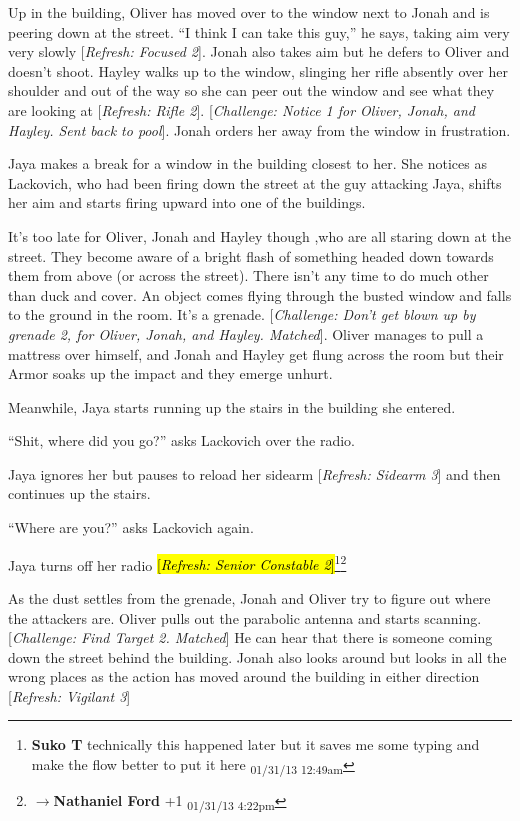 Up in the building, Oliver has moved over to the window next to Jonah and is peering down at the street.  ``I think I can take this guy,'' he says, taking aim very very slowly {[}\textit{Refresh: Focused 2}{]}.  Jonah also takes aim but he defers to Oliver and doesn't shoot.  Hayley walks up to the window, slinging her rifle absently over her shoulder and out of the way so she can peer out the window and see what they are looking at {[}\textit{Refresh: Rifle 2}{]}.  {[}\textit{Challenge: Notice 1 for Oliver, Jonah, and Hayley. Sent back to pool}{]}.  Jonah orders her away from the window in frustration.



Jaya makes a break for a window in the building closest to her.  She notices as Lackovich, who had been firing down the street at the guy attacking Jaya, shifts her aim and starts firing upward into one of the buildings.



It's too late for Oliver, Jonah and Hayley though ,who are all staring down at the street. They become aware of a bright flash of something headed down towards them from above (or across the street).  There isn't any time to do much other than duck and cover.  An object comes flying through the busted window and falls to the ground in the room.  It's a grenade.  {[}\textit{Challenge: Don't get blown up by grenade 2, for Oliver, Jonah, and Hayley.  Matched}{]}.  Oliver manages to pull a mattress over himself, and Jonah and Hayley get flung across the room but their Armor soaks up the impact and they emerge unhurt.



Meanwhile, Jaya starts running up the stairs in the building she entered.

``Shit, where did you go?'' asks Lackovich over the radio. 

Jaya ignores her but pauses to reload her sidearm {[}\textit{Refresh: Sidearm 3}{]} and then continues up the stairs.

``Where are you?'' asks Lackovich again.

Jaya turns off her radio \hl{{[}\textit{Refresh: Senior Constable 2}{]}}\footnote{\textbf{Suko T }technically this happened later but it saves me some typing and make the flow better to put it here \textsubscript{01/31/13 12:49am}}\footnote{$\rightarrow$\textbf{Nathaniel Ford }+1 \textsubscript{01/31/13 4:22pm}}



As the dust settles from the grenade, Jonah and Oliver try to figure out where the attackers are.  Oliver pulls out the parabolic antenna and starts scanning. {[}\textit{Challenge: Find Target 2.  Matched}{]}  He can hear that there is someone coming down the street behind the building.  Jonah also looks around but looks in all the wrong places as the action has moved around the building in either direction {[}\textit{Refresh: Vigilant 3}{]}



